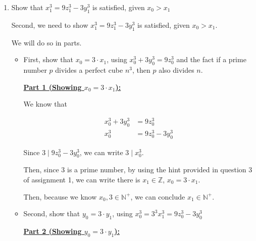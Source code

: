 \documentclass[12pt]{article}
\begin{document}
\begin{mdframed}
\begin{enumerate}[1.]
        \item Show that $x_1^3 = 9z_1^3 - 3y_1^3$ is satisfied, given $x_0 > x_1$

        \bigskip

        Second, we need to show $x_1^3 = 9z_1^3 - 3y_1^3$ is satisfied, given
        $x_0 > x_1$.

        \bigskip

        We will do so in parts.

        \bigskip

        \begin{itemize}
            \item First, show that $x_0 = 3 \cdot x_1$, using $x_0^3 + 3y_0^3 = 9z_0^3$ and the
            fact if a prime number $p$ divides a perfect cube $n^3$, then $p$ also divides $n$.

            \begin{mdframed}
            \underline{\textbf{Part 1 (Showing $x_0 = 3 \cdot x_1$):}}

            \bigskip

            We know that

            \begin{align}
                x_0^3 + 3y_0^3 &= 9z_0^3\\
                x_0^3 &= 9z_0^3 - 3y_0^3
            \end{align}

            \bigskip

            Since $3 \mid 9z_0^3 - 3y_0^3$, we can write $3 \mid x_0^3$.

            \bigskip

            Then, since 3 is a prime number, by using the hint provided in question 3
            of assignment 1, we can write there is $x_1 \in \mathbb{Z}$, $x_0 = 3 \cdot x_1$.

            \bigskip

            Then, because we know $x_0, 3 \in \mathbb{N}^+$, we can conclude
            $x_1 \in \mathbb{N}^+$.

            \end{mdframed}

            \item Second, show that $y_0 = 3 \cdot y_1$, using $x_0^3 = 3^3 x_1^3 = 9z_0^3 - 3y_0^3$

            \begin{mdframed}
            \underline{\textbf{Part 2 (Showing $y_0 = 3 \cdot y_1$):}}


\end{mdframed}
\end{itemize}
\end{enumerate}
\end{mdframed}
\end{document}
